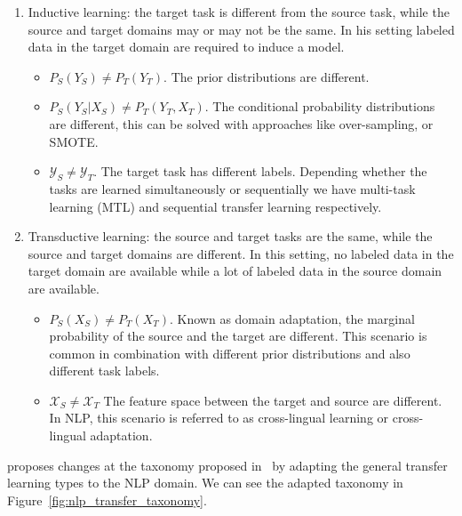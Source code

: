 \begin{enumerate}[a -]
    \item Inductive learning: the target task is different from the source task, while the source and target domains may or may not be the same. In his setting labeled data in the target domain are required to induce a model.
        \begin{itemize}[- ]
            \item $P_S(Y_S) \neq P_T(Y_T)$. The prior distributions are different. 
            \item $P_S(Y_S | X_S) \neq P_T(Y_T, X_T)$. The conditional probability distributions are different, this can be solved with approaches like over-sampling, or SMOTE.
            \item $\mathcal{Y}_S \neq \mathcal{Y}_T$. The target task has different labels. Depending whether the tasks are learned simultaneously or sequentially we have multi-task learning (MTL) and sequential transfer learning respectively.  
        \end{itemize}
    
    \item Transductive learning: the source and target tasks are the same, while the source and target domains are different. In this setting, no labeled data in the target domain are available while a lot of labeled data in the source domain are available.
        \begin{itemize}[- ]
            \item $P_S(X_S) \neq P_T(X_T)$. Known as domain adaptation, the marginal probability of the source and the target are different. This scenario is common in combination with different prior distributions and also different task labels.
            \item $\mathcal{X}_S \neq \mathcal{X}_T$ The feature space between the target and source are different. In NLP, this scenario is referred to as cross-lingual learning or cross-lingual adaptation.
        \end{itemize}

\end{enumerate}

\citet{ruder2019neural} proposes changes at the taxonomy proposed in~\citet{pan2010transfer} by adapting the general transfer learning types to the NLP domain. We can see the adapted taxonomy in Figure~\ref{fig:nlp_transfer_taxonomy}.

